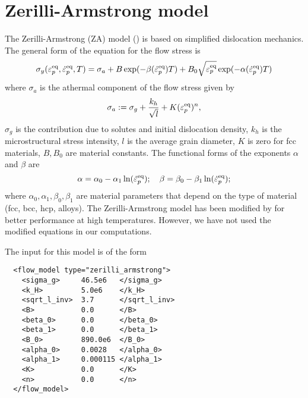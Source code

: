 \section{Zerilli-Armstrong model}
The Zerilli-Armstrong (ZA) model (\cite{Zerilli1987,Zerilli1993,Zerilli2004}) 
is based on simplified dislocation mechanics.  The general form of the
equation for the flow stress is
\begin{equation}
  \sigma_y(\varepsilon_p^\text{eq},\dot{\varepsilon}_{p}^\text{eq},T) = 
    \sigma_a + B\exp(-\beta(\dot{\varepsilon}_{p}^\text{eq}) T) + 
                         B_0\sqrt{\varepsilon_p^\text{eq}}\exp(-\alpha(\dot{\varepsilon}_{p}^\text{eq}) T)
\end{equation}
where $\sigma_a$ is the athermal component of the flow stress given by
\begin{equation}
  \sigma_a := \sigma_g + \frac{k_h}{\sqrt{l}} + K(\varepsilon_p^\text{eq})^n,
\end{equation}
$\sigma_g$ is the contribution due to solutes and initial dislocation
density, $k_h$ is the microstructural stress intensity, $l$ is the 
average grain diameter, $K$ is zero for fcc materials, 
$B, B_0$ are material constants.  The functional forms of the exponents 
$\alpha$ and $\beta$ are 
\begin{equation}
  \alpha = \alpha_0 - \alpha_1 \ln(\dot{\varepsilon}_{p}^\text{eq}); \quad
  \beta = \beta_0 - \beta_1 \ln(\dot{\varepsilon}_{p}^\text{eq}); 
\end{equation}
where $\alpha_0, \alpha_1, \beta_0, \beta_1$ are material parameters that
depend on the type of material (fcc, bcc, hcp, alloys).  The Zerilli-Armstrong
model has been modified by \cite{Abed2005} for better performance at high 
temperatures.  However, we have not used the modified equations in our
computations.

The input for this model is of the form
\lstset{language=XML}
\begin{lstlisting}
  <flow_model type="zerilli_armstrong">
    <sigma_g>     46.5e6   </sigma_g>
    <k_H>         5.0e6    </k_H>
    <sqrt_l_inv>  3.7      </sqrt_l_inv>
    <B>           0.0      </B>
    <beta_0>      0.0      </beta_0>
    <beta_1>      0.0      </beta_1>
    <B_0>         890.0e6  </B_0>
    <alpha_0>     0.0028   </alpha_0>
    <alpha_1>     0.000115 </alpha_1>
    <K>           0.0      </K>
    <n>           0.0      </n>
  </flow_model>
\end{lstlisting}

